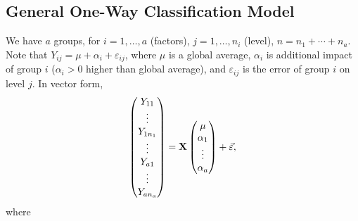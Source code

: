 \subsection*{General One-Way Classification Model}
We have $ a $ groups, for $ i=1,\ldots,a $ (factors),
$ j=1,\ldots,n_i $ (level), $ n=n_1+\cdots+n_a $.
Note that $ Y_{ij}=\mu+\alpha_i+\varepsilon_{ij} $,
where $ \mu $ is a global average, $ \alpha_i $
is additional impact of group $ i $ ($ \alpha_i>0 $ higher than global average),
and $ \varepsilon_{ij} $ is the error of group $ i $ on level $ j $. In vector form,
\[ \begin{pmatrix}
        Y_{11}   \\
        \vdots   \\
        Y_{1n_1} \\
        \vdots   \\
        Y_{a1}   \\
        \vdots   \\
        Y_{an_a}
    \end{pmatrix}=\mathbf{X}\begin{pmatrix}
        \mu      \\
        \alpha_1 \\
        \vdots   \\
        \alpha_a
    \end{pmatrix}+\vec{\varepsilon}, \]
where
